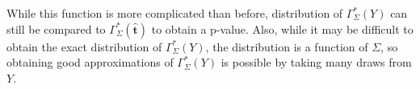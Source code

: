 \documentclass{article}
\newcommand{\vmat}{\Sigma}
\newcommand{\tst}{\hat{\boldsymbol{t}}}
\newcommand{\rvt}{Y}
\newcommand{\Gammaf}{\Gamma_{\Sigma}}
\begin{document}
While this function is more complicated than before, distribution of $\Gammaf^*(\rvt)$ can still be compared to $\Gammaf^*(\tst)$ to obtain a p-value. Also, while it may be difficult to obtain the exact distribution of $\Gammaf^*(\rvt)$, the distribution is a function of $\vmat$, so obtaining good approximations of $\Gammaf^*(\rvt)$ is possible by taking many draws from $\rvt$.




\end{document}
